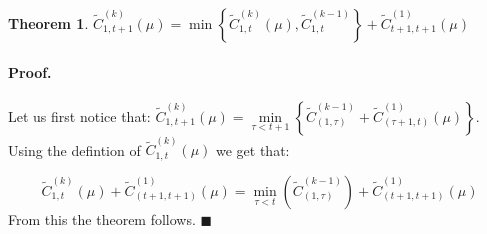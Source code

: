 \documentclass[11pt]{llncs}
\newtheorem{theo}{Theorem}[section]    %
\begin{document}

\begin{theo}
$ \widetilde{C}_{1, t+1}^{(k)}(\mu) = \min \left\{ \widetilde{C}_{1, t}^{(k)}(\mu),  \widetilde{C}_{1, t}^{(k-1)} \right\} +  \widetilde{C}_{t+1, t+1}^{(1)}(\mu) $
\end{theo}

\paragraph{Proof. } Let us first notice that: 
$ \widetilde{C}_{1, t+1}^{(k)}(\mu) =  \underset{{\tau < t+1} }{\min}\left\{  \widetilde{C}_{(1,\tau)}^{(k-1)}  +  \widetilde{C}_{(\tau+1, t)}^{(1)}(\mu) \right\}
.$
Using the defintion of $\widetilde{C}_{1, t}^{(k)}(\mu) $ we get that:

$$ \widetilde{C}_{1, t}^{(k)}(\mu) + \widetilde{C}_{(t+1, t+1)}^{(1)}(\mu)=
 \underset{{\tau < t}}{\min} \left(  \widetilde{C}_{(1,\tau)}^{(k-1)} \right) + \widetilde{C}_{(t+1, t+1)}^{(1)}(\mu)$$
\noindent From this the theorem follows. $\blacksquare$ \\
\end{document}
